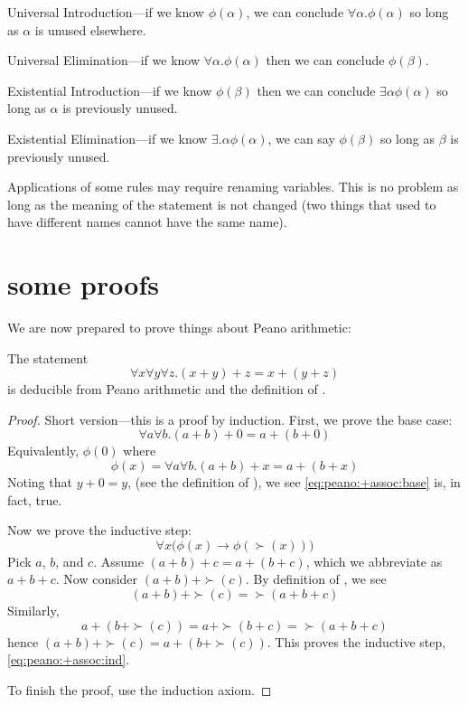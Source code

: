 \message{ !name(truth.tex)}\documentclass{scrbook}
\renewcommand{\implies}{\to}
\begin{document}
 
\begin{trivlist}
\item Universal Introduction---if we know $\phi(\alpha)$, we can conclude $\forall \alpha . \phi(\alpha)$ so long as $\alpha$ is unused elsewhere.
\item Universal Elimination---if we know $\forall \alpha . \phi(\alpha)$ then we can conclude $\phi(\beta)$. 
\item Existential Introduction---if we know $\phi(\beta)$ then we can conclude $\exists \alpha \phi(\alpha)$ so long as $\alpha$ is previously unused.
\item Existential Elimination---if we know $\exists. \alpha \phi(\alpha)$, we can say $\phi(\beta)$ so long as $\beta$ is previously unused. 
\end{trivlist}
Applications of some rules may require renaming variables. This is no problem as long as the meaning of the statement is not changed (\ie two things that used to have different names cannot have the same name). 

\section[Some Proofs]{some proofs}
We are now prepared to prove things about Peano arithmetic:

\begin{theorem}[$+$ is associative]
  The statement 
  \[
  \forall x \forall y \forall z . (x+y)+z = x+(y+z)
  \]
  is deducible from Peano arithmetic and the definition of .
\end{theorem}
\begin{proof}
  Short version---this is a proof by induction. First, we prove the base case:
   \begin{equation}
    \label{eq:peano:+assoc:base}
    \forall a \forall b .  (a+b) + 0 = a+(b+0)
  \end{equation}
  Equivalently, $\phi(0)$ where
  \[
  \phi(x) = \forall a \forall b . (a+b)+x = a+(b+x)
  \]
  Noting that $y+0=y$, (see the definition of  ), we 
  see \cref{eq:peano:+assoc:base} is, in fact, true. 
 
  Now we prove the inductive step: 
  \begin{equation}
    \label{eq:peano:+assoc:ind}
    \forall x \bigl(\phi(x)\implies \phi(\succ(x))\bigr)   
  \end{equation}
  Pick $a$, $b$, and $c$. 
  Assume $(a+b)+c = a+(b+c)$, which we abbreviate as $a+b+c$. Now consider $(a+b)+\succ(c)$. By definition of , we see \[(a+b)+\succ(c)=\succ(a+b+c)\] Similarly, \[a+(b+\succ(c))=a+\succ(b+c)=\succ(a+b+c)\]
  hence $(a+b)+\succ(c)=a+(b+\succ(c))$. This proves the inductive step, \cref{eq:peano:+assoc:ind}.
  
  To finish the proof, use the induction axiom. 
\end{proof}
\end{document}
